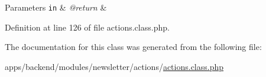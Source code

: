 \begin{DoxyParams}[1]{Parameters}
\mbox{\tt in}  & {\em @return} & \\
\hline
\end{DoxyParams}


Definition at line 126 of file actions.\-class.\-php.



The documentation for this class was generated from the following file\-:\begin{DoxyCompactItemize}
\item 
apps/backend/modules/newsletter/actions/\hyperlink{backend_2modules_2newsletter_2actions_2actions_8class_8php}{actions.\-class.\-php}\end{DoxyCompactItemize}

